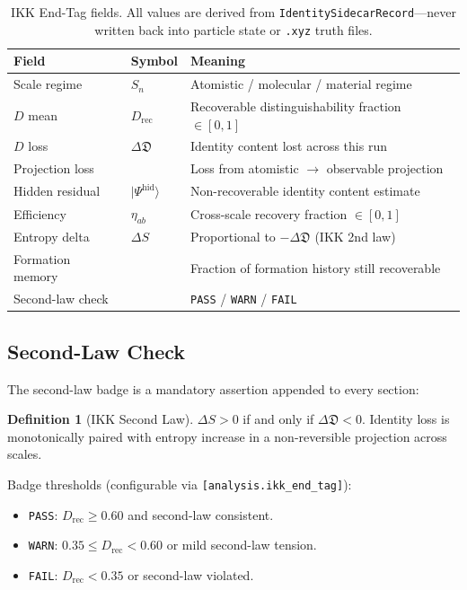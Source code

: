 \documentclass[11pt,a4paper]{article}
\theoremstyle{definition}
\newtheorem{definition}{Definition}[section]
\newcommand{\Dfrak}{\mathfrak{D}}
\newcommand{\etaab}{\eta_{ab}}
\newcommand{\Psihid}{|\Psi^{\mathrm{hid}}\rangle}
\newcommand{\Drec}{D_{\mathrm{rec}}}
\newcommand{\DeltaD}{\Delta\Dfrak}
\newcommand{\DeltaS}{\Delta S}
\newcommand{\Sn}{S_n}
\newcommand{\Dpass}[1]{\colorbox{green!25}{\texttt{\small #1}}}
\newcommand{\Dwarn}[1]{\colorbox{yellow!45}{\texttt{\small #1}}}
\newcommand{\Dfail}[1]{\colorbox{red!25}{\texttt{\small #1}}}
\begin{document}
\begin{table}[H]
\centering
\small
\begin{tabular}{@{}lll@{}}
\toprule
Field & Symbol & Meaning \\
\midrule
Scale regime      & $\Sn$          & Atomistic / molecular / material regime \\
$D$ mean          & $\Drec$        & Recoverable distinguishability fraction $\in[0,1]$ \\
$D$ loss          & $\DeltaD$      & Identity content lost across this run \\
Projection loss   &                & Loss from atomistic $\to$ observable projection \\
Hidden residual   & $\Psihid$      & Non-recoverable identity content estimate \\
Efficiency        & $\etaab$       & Cross-scale recovery fraction $\in[0,1]$ \\
Entropy delta     & $\DeltaS$      & Proportional to $-\DeltaD$ (IKK 2nd law) \\
Formation memory  &                & Fraction of formation history still recoverable \\
Second-law check  &                & \Dpass{PASS} / \Dwarn{WARN} / \Dfail{FAIL} \\
\bottomrule
\end{tabular}
\caption{IKK End-Tag fields. All values are derived from \texttt{IdentitySidecarRecord}---never
  written back into particle state or \texttt{.xyz} truth files.}
\end{table}

\subsection{Second-Law Check}

The second-law badge is a mandatory assertion appended to every section:

\begin{definition}[IKK Second Law]\label{def:secondlaw}
  $\DeltaS > 0$ if and only if $\DeltaD < 0$.
  Identity loss is monotonically paired with entropy increase in a
  non-reversible projection across scales.
\end{definition}

Badge thresholds (configurable via \texttt{[analysis.ikk\_end\_tag]}):

\begin{itemize}
  \item \Dpass{PASS}: $\Drec \geq 0.60$ and second-law consistent.
  \item \Dwarn{WARN}: $0.35 \leq \Drec < 0.60$ or mild second-law tension.
  \item \Dfail{FAIL}: $\Drec < 0.35$ or second-law violated.
\end{itemize}
\end{document}
